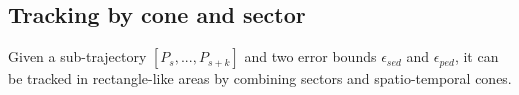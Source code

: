 \subsection{Tracking by cone and sector}

\begin{theorem}
	\label{theo-binary}
	Given a sub-trajectory $[P_s,...,P_{s+k}]$ and two error bounds $\epsilon_{sed}$ and $\epsilon_{ped}$, it can be tracked in rectangle-like areas by combining sectors and spatio-temporal cones.
\end{theorem}









